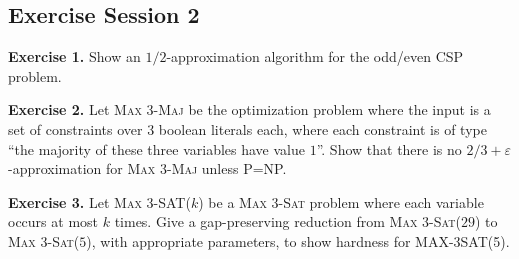 \begin{multicols}{3}





\section{Exercise Session 2}

{\bf Exercise 1.} Show an $1/2$-approximation algorithm for the odd/even CSP problem.

{\bf Exercise 2.} Let \textsc{Max 3-Maj} be the optimization problem
where the input is a set of constraints over $3$ boolean literals
each, where each constraint is of type ``the majority of these three
variables have value $1$''. Show that there is no $2/3 +
ε$-approximation for \textsc{Max 3-Maj} unless P=NP.

{\bf Exercise 3.} Let \textsc{Max 3-SAT($k$)} be a \textsc{Max 3-Sat}
problem where each variable occurs at most $k$ times. Give a
gap-preserving reduction from \textsc{Max 3-Sat($29$)} to \textsc{Max
3-Sat($5$)}, with appropriate parameters, to show hardness for
MAX-3SAT(5).

\end{multicols}

